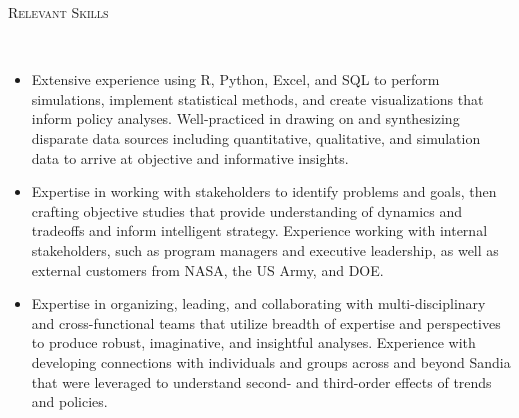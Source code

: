 \documentclass[11pt]{article}
\newenvironment{changemargin}[2]{%
  \begin{list}{}{%
    \setlength{\topsep}{0pt}%
    \setlength{\leftmargin}{#1}%
    \setlength{\rightmargin}{#2}%
    \setlength{\listparindent}{\parindent}%
    \setlength{\itemindent}{\parindent}%
    \setlength{\parsep}{\parskip}%
  }%
  \item[]}{\end{list}
}
\newcommand{\lineover}{
	\begin{changemargin}{-0.05in}{-0.05in}
		\vspace*{-8pt}
		\hrulefill \\
		\vspace*{-2pt}
	\end{changemargin}
}
\newcommand{\header}[1]{
	\begin{changemargin}{-0.5in}{-0.5in}
		\scshape{#1}\\
	\vspace*{-5pt}
  	\lineover
	\end{changemargin}
}
\newenvironment{body} {
	\vspace*{-16pt}
	\begin{changemargin}{-0.25in}{-0.5in}
  }	
	{\end{changemargin}
}
\begin{document}
\pagebreak
\header{Relevant Skills}
\begin{body}
	\vspace{14pt}
	\begin{itemize}
		\item Extensive experience using R, Python, Excel, and SQL to perform simulations, implement statistical methods, and create visualizations that inform policy analyses.  Well-practiced in drawing on and synthesizing disparate data sources including quantitative, qualitative, and simulation data to arrive at objective and informative insights.
		\item Expertise in working with stakeholders to identify problems and goals, then crafting objective studies that provide understanding of dynamics and tradeoffs and inform intelligent strategy. Experience working with internal stakeholders, such as program managers and executive leadership, as well as external customers from NASA, the US Army, and DOE.
		\item Expertise in organizing, leading, and collaborating with multi-disciplinary and cross-functional teams that utilize breadth of expertise and perspectives to produce robust, imaginative, and insightful analyses. Experience with developing connections with individuals and groups across and beyond Sandia that were leveraged to understand second- and third-order effects of trends and policies.
	\end{itemize}
\end{body}
\end{document}
